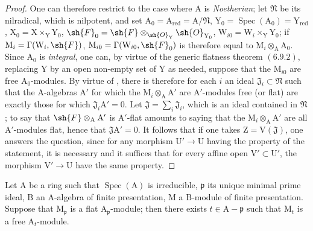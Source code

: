 \begin{proof}
One can therefore restrict to the case where $\mathrm{A}$ is \emph{Noetherian}; let $\mathfrak{N}$ be its nilradical, which is
nilpotent, and set $\mathrm{A}_0=\mathrm{A}_{\mathrm{red}}=\mathrm{A}/\mathfrak{N}$, $\mathrm{Y}_0=\operatorname{Spec}(\mathrm{A}_0)=\mathrm{Y}_{\mathrm{red}}$, $\mathrm{X}_0=\mathrm{X}\times_\mathrm{Y}\mathrm{Y}_0$, $\sh{F}_0=\sh{F}\otimes_{\sh{O}_\mathrm{Y}}\sh{O}_{\mathrm{Y}_0}$,
$\mathrm{W}_{i0}=\mathrm{W}_i\times_\mathrm{Y}\mathrm{Y}_0$; if $\mathrm{M}_i=\Gamma(\mathrm{W}_i,\sh{F})$, $\mathrm{M}_{i0}=\Gamma(\mathrm{W}_{i0},\sh{F}_0)$ is therefore equal to $\mathrm{M}_i\otimes_\mathrm{A}\mathrm{A}_0$.
Since $\mathrm{A}_0$ is \emph{integral}, one can, by virtue of the generic flatness theorem $(6.9.2)$,
replacing $\mathrm{Y}$ by an open non-empty set of $\mathrm{Y}$ as needed, suppose that the $\mathrm{M}_{i0}$ are
free $\mathrm{A}_0$-modules. By virtue of , there is therefore for each $i$ an ideal $\mathfrak{J}_i\subset\mathfrak{N}$ such
that the $\mathrm{A}$-algebras $\mathrm{A}'$ for which the $\mathrm{M}_i\otimes_\mathrm{A}\mathrm{A}'$ are $\mathrm{A}'$-modules free (or flat)
are exactly those for which $\mathfrak{J}_i\mathrm{A}'=0$. Let $\mathfrak{J}=\sum_i\mathfrak{J}_i$, which is an ideal contained
in $\mathfrak{N}$; to say that $\sh{F}\otimes_{\mathrm{A}}\mathrm{A}'$ is $\mathrm{A}'$-flat amounts to saying that the $\mathrm{M}_i\otimes_\mathrm{A}\mathrm{A}'$ are all
$\mathrm{A}'$-modules flat, hence that $\mathfrak{J}\mathrm{A}'=0$. It follows that if one takes $\mathrm{Z}=\mathrm{V}(\mathfrak{J})$, one
answers the question, since for any morphism $\mathrm{U}'\to\mathrm{U}$ having the property of the statement,
it is necessary and it suffices that for every affine open $\mathrm{V}'\subset\mathrm{U}'$, the morphism $\mathrm{V}'\to\mathrm{U}$
have the same property.
\end{proof}

\begin{corollary}[11.4.6]
\label{IV.11.4.6}
Let $\mathrm{A}$ be a ring such that $\operatorname{Spec}(\mathrm{A})$ is irreducible, $\mathfrak{p}$ its unique
minimal prime ideal, $\mathrm{B}$ an $\mathrm{A}$-algebra of finite presentation, $\mathrm{M}$ a $\mathrm{B}$-module of finite presentation.
Suppose that $\mathrm{M}_\mathfrak{p}$ is a flat $\mathrm{A}_\mathfrak{p}$-module; then there exists $t\in\mathrm{A}-\mathfrak{p}$ such that $\mathrm{M}_t$ is a free $\mathrm{A}_t$-module.
\end{corollary}

